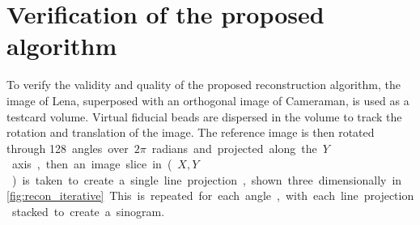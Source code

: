 \documentclass[times, twoside, watermark]{zHenriquesLab-StyleBioRxiv}
\begin{document}
\section*{Verification of the proposed algorithm}

To verify the validity and quality of the proposed reconstruction algorithm, the image of Lena, superposed with an orthogonal image of Cameraman, is used as a testcard volume.
Virtual fiducial beads are dispersed in the volume to track the rotation and translation of the image.%
The reference image is then rotated through \SI{128} angles over \(2\pi \) radians and projected along the \(Y\) axis, then an image slice in (\(X,Y\)) is taken to create a single line projection, shown three dimensionally in \figurename~\ref{fig:recon_iterative}.
This is repeated for each angle,  with each line projection stacked to create a sinogram.%

\end{document}
